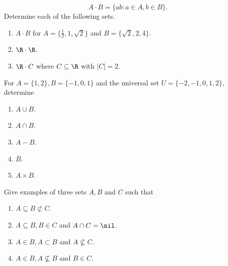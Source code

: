 \documentclass{homework}
\begin{document}
\[
    A \cdot B = \{ab: a \in A, b \in B\}.
\]
Determine each of the following sets.
\begin{enumerate}
    \item $A \cdot B$ for $A = \{\frac{1}{2}, 1, \sqrt{2}\}$ and $B = \{\sqrt{2}, 2, 4\}$.

    
    \item $\R \cdot \R$.

    
    \item $\R \cdot C$ where $C \subseteq \R$ with $|C| = 2$.

\end{enumerate}
\question For $A = \{1, 2\}, B = \{-1, 0, 1\}$ and the universal set $U = \{-2, -1, 0, 1, 2\}$, determine
\begin{enumerate}[label=(\alph*)]
    \item $A \cup B$.

    
    \item $A \cap B$.

    
    \item $A - B$.

    
    \item $\overline{B}$.

    
    \item $A \times B$.

\end{enumerate}

\question Give examples of three sets $A, B$ and $C$ such that
\begin{enumerate}[label=(\alph*)]
    \item $A \subseteq B \not\subset C$.

    
    \item $A \subseteq B, B \in C$ and $A \cap C = \nil$.

    
    \item $A \in B, A \subset B$ and $A \not\subseteq C$.

    
    \item $A \in B, A \not\subseteq B$ and $B \in C$.

\end{enumerate}
\end{document}
